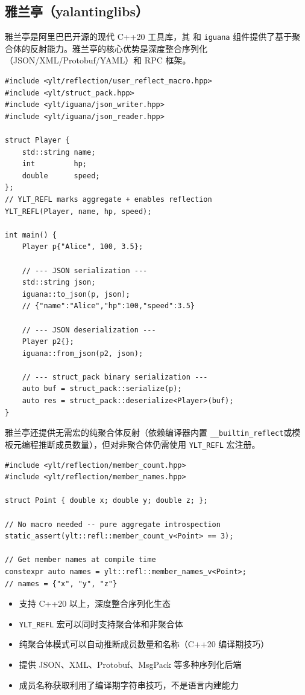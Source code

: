 \documentclass[12pt,a4paper,fontset=fandol]{ctexbook}
\begin{document}
\subsection{雅兰亭（yalantinglibs）}\label{subsec:ylt}

雅兰亭是阿里巴巴开源的现代 C++20 工具库，其 \texttt{} 和 \texttt{iguana} 组件提供了基于聚合体的反射能力。雅兰亭的核心优势是深度整合序列化（JSON/\allowbreak{}\allowbreak XML/\allowbreak{}\allowbreak Protobuf/\allowbreak{}\allowbreak YAML）和 RPC 框架。

\begin{lstlisting}[caption={雅兰亭: 聚合体序列化与反射}]
#include <ylt/reflection/user_reflect_macro.hpp>
#include <ylt/struct_pack.hpp>
#include <ylt/iguana/json_writer.hpp>
#include <ylt/iguana/json_reader.hpp>

struct Player {
    std::string name;
    int         hp;
    double      speed;
};
// YLT_REFL marks aggregate + enables reflection
YLT_REFL(Player, name, hp, speed);

int main() {
    Player p{"Alice", 100, 3.5};

    // --- JSON serialization ---
    std::string json;
    iguana::to_json(p, json);
    // {"name":"Alice","hp":100,"speed":3.5}

    // --- JSON deserialization ---
    Player p2{};
    iguana::from_json(p2, json);

    // --- struct_pack binary serialization ---
    auto buf = struct_pack::serialize(p);
    auto res = struct_pack::deserialize<Player>(buf);
}
\end{lstlisting}

雅兰亭还提供无需宏的纯聚合体反射（依赖编译器内置 \texttt{\_\_builtin\_reflect}或模板元编程推断成员数量），但对非聚合体仍需使用 \texttt{YLT\_REFL} 宏注册。

\begin{lstlisting}[caption={雅兰亭: 无宏聚合体自动反射}]
#include <ylt/reflection/member_count.hpp>
#include <ylt/reflection/member_names.hpp>

struct Point { double x; double y; double z; };

// No macro needed -- pure aggregate introspection
static_assert(ylt::refl::member_count_v<Point> == 3);

// Get member names at compile time
constexpr auto names = ylt::refl::member_names_v<Point>;
// names = {"x", "y", "z"}
\end{lstlisting}

\begin{note}[title={雅兰亭技术要点}]
\begin{itemize}[nosep]
  \item 支持 C++20 以上，深度整合序列化生态
  \item \texttt{YLT\_REFL} 宏可以同时支持聚合体和非聚合体
  \item 纯聚合体模式可以自动推断成员数量和名称（C++20 编译期技巧）
  \item 提供 JSON、XML、Protobuf、MsgPack 等多种序列化后端
  \item 成员名称获取利用了编译期字符串技巧，不是语言内建能力
\end{itemize}
\end{note}
\end{document}
